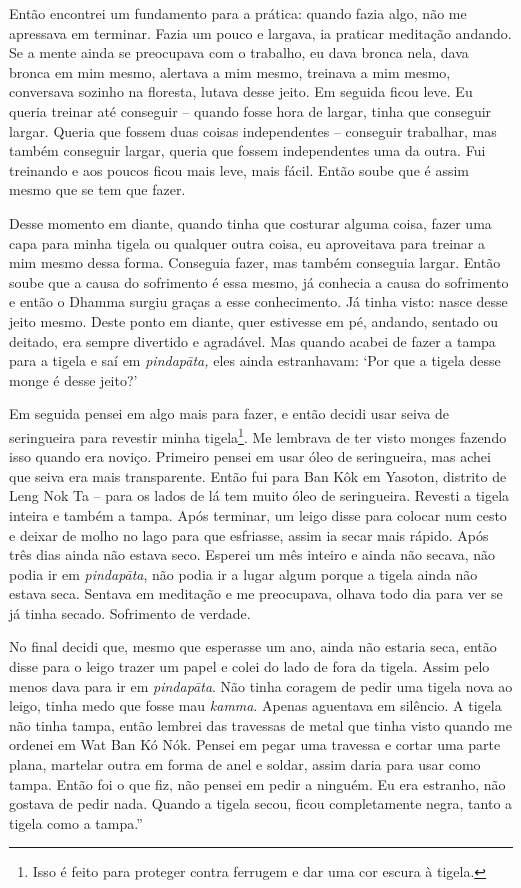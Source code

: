 Então encontrei um fundamento para a prática: quando fazia algo, não me
apressava em terminar. Fazia um pouco e largava, ia praticar meditação
andando. Se a mente ainda se preocupava com o trabalho, eu dava bronca
nela, dava bronca em mim mesmo, alertava a mim mesmo, treinava a mim
mesmo, conversava sozinho na floresta, lutava desse jeito. Em seguida
ficou leve. Eu queria treinar até conseguir -- quando fosse hora de
largar, tinha que conseguir largar. Queria que fossem duas coisas
independentes -- conseguir trabalhar, mas também conseguir largar,
queria que fossem independentes uma da outra. Fui treinando e aos poucos
ficou mais leve, mais fácil. Então soube que é assim mesmo que se tem
que fazer.

Desse momento em diante, quando tinha que costurar alguma coisa, fazer
uma capa para minha tigela ou qualquer outra coisa, eu aproveitava para
treinar a mim mesmo dessa forma. Conseguia fazer, mas também conseguia
largar. Então soube que a causa do sofrimento é essa mesmo, já conhecia
a causa do sofrimento e então o Dhamma surgiu graças a esse
conhecimento. Já tinha visto: nasce desse jeito mesmo. Deste ponto em
diante, quer estivesse em pé, andando, sentado ou deitado, era sempre
divertido e agradável. Mas quando acabei de fazer a tampa para a tigela
e saí em \emph{pindapāta,} eles ainda estranhavam: `Por que a tigela
desse monge é desse jeito?'

Em seguida pensei em algo mais para fazer, e então decidi usar seiva de
seringueira para revestir minha tigela\footnote{Isso é feito para
  proteger contra ferrugem e dar uma cor escura à tigela.}. Me lembrava
de ter visto monges fazendo isso quando era noviço. Primeiro pensei em
usar óleo de seringueira, mas achei que seiva era mais transparente.
Então fui para Ban Kôk em Yasoton, distrito de Leng Nok Ta -- para os
lados de lá tem muito óleo de seringueira. Revesti a tigela inteira e
também a tampa. Após terminar, um leigo disse para colocar num cesto e
deixar de molho no lago para que esfriasse, assim ia secar mais rápido.
Após três dias ainda não estava seco. Esperei um mês inteiro e ainda não
secava, não podia ir em \emph{pindapāta}, não podia ir a lugar algum
porque a tigela ainda não estava seca. Sentava em meditação e me
preocupava, olhava todo dia para ver se já tinha secado. Sofrimento de
verdade.

No final decidi que, mesmo que esperasse um ano, ainda não estaria seca,
então disse para o leigo trazer um papel e colei do lado de fora da
tigela. Assim pelo menos dava para ir em \emph{pindapāta}. Não tinha
coragem de pedir uma tigela nova ao leigo, tinha medo que fosse mau
\emph{kamma}. Apenas aguentava em silêncio. A tigela não tinha tampa,
então lembrei das travessas de metal que tinha visto quando me ordenei
em Wat Ban Kó Nók. Pensei em pegar uma travessa e cortar uma parte
plana, martelar outra em forma de anel e soldar, assim daria para usar
como tampa. Então foi o que fiz, não pensei em pedir a ninguém. Eu era
estranho, não gostava de pedir nada. Quando a tigela secou, ficou
completamente negra, tanto a tigela como a tampa.''

